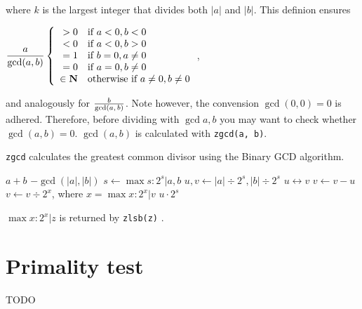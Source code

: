 \noindent
where $k$ is the largest integer that divides
both $\lvert a \rvert$ and $\lvert b \rvert$. This
definion ensures

\vspace{1em}
\( \displaystyle{
    {a \over \gcd(a, b)} \left \lbrace \begin{array}{rl}
        > 0 & \textrm{if}~ a < 0, b < 0 \\
        < 0 & \textrm{if}~ a < 0, b > 0 \\
        = 1 & \textrm{if}~ b = 0, a \neq 0 \\
        = 0 & \textrm{if}~ a = 0, b \neq 0 \\
        \in \textbf{N} & \textrm{otherwise if}~ a \neq 0, b \neq 0
    \end{array} \right .
}\),
\vspace{1em}

\noindent
and analogously for $b \over \gcd(a,\,b)$. Note however,
the convension $\gcd(0, 0) = 0$ is adhered. Therefore,
before dividing with $\gcd{a, b}$ you may want to check
whether $\gcd(a, b) = 0$. $\gcd(a, b)$ is calculated
with {\tt zgcd(a, b)}.

{\tt zgcd} calculates the greatest common divisor using
the Binary GCD algorithm.

\vspace{1em}
\hspace{-2.8ex}
\begin{minipage}{\linewidth}
\begin{algorithmic}
        \RETURN $a + b$
        \RETURN $-\gcd(\lvert a \rvert, \lvert b \rvert)$
    \ENDIF
    \STATE $s \gets \max s : 2^s \vert a, b$
    \STATE $u, v \gets \lvert a \rvert \div 2^s, \lvert b \rvert \div 2^s$
            \STATE $u \leftrightarrow v$
        \ENDIF
        \STATE $v \gets v - u$
        \STATE $v \gets v \div 2^x$, where $x = \max x : 2^x \vert v$
    \ENDWHILE
    \RETURN $u \cdot 2^s$
\end{algorithmic}
\end{minipage}
\vspace{1em}

\noindent
$\max x : 2^x \vert z$ is returned by {\tt zlsb(z)}
.


\newpage
\section{Primality test}
\label{sec:Primality test}

TODO %
